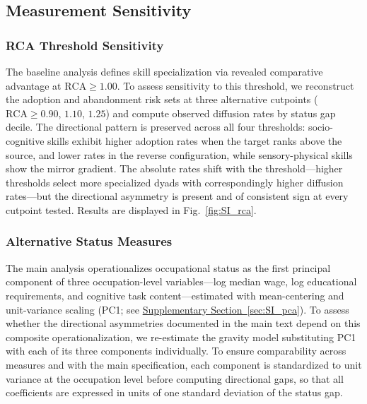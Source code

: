 \documentclass[11pt, letterpaper]{article} %
\begin{document}


\subsection{Measurement Sensitivity}
 
\subsubsection{RCA Threshold Sensitivity}
\label{sec:SI_rca_threshold}

The baseline analysis defines skill specialization via revealed comparative advantage at $\mathrm{RCA} \geq 1.00$. To assess sensitivity to this threshold, we reconstruct the adoption and abandonment risk sets at three alternative cutpoints ($\mathrm{RCA} \geq 0.90$, $1.10$, $1.25$) and compute observed diffusion rates by status gap decile. The directional pattern is preserved across all four thresholds: socio-cognitive skills exhibit higher adoption rates when the target ranks above the source, and lower rates in the reverse configuration, while sensory-physical skills show the mirror gradient. The absolute rates shift with the threshold---higher thresholds select more specialized dyads with correspondingly higher diffusion rates---but the directional asymmetry is present and of consistent sign at every cutpoint tested. Results are displayed in Fig.~\ref{fig:SI_rca}.
 

 
\subsubsection{Alternative Status Measures}
\label{sec:SI_alt_status}
 
The main analysis operationalizes occupational status as the first principal component of three occupation-level variables---log median wage, log educational requirements, and cognitive task content---estimated with mean-centering and unit-variance scaling (PC1; see \hyperref[sec:SI_pca]{Supplementary Section~\ref*{sec:SI_pca}}). To assess whether the directional asymmetries documented in the main text depend on this composite operationalization, we re-estimate the gravity model substituting PC1 with each of its three components individually. To ensure comparability across measures and with the main specification, each component is standardized to unit variance at the occupation level before computing directional gaps, so that all coefficients are expressed in units of one standard deviation of the status gap.
\end{document}
